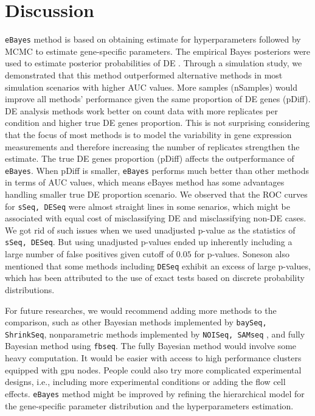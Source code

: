 \chapter{Discussion}


\texttt{eBayes} method is based on obtaining estimate for hyperparameters followed by MCMC to estimate gene-specific parameters. The empirical Bayes posteriors were used to estimate posterior probabilities of DE . Through a simulation study, we demonstrated that this method outperformed alternative methods in most simulation scenarios with higher AUC values. More samples (nSamples) would improve all methods' performance given the same proportion of DE genes (pDiff). DE analysis methods work better on count data with more replicates per condition and higher true DE genes proportion. This is not surprising considering that the focus of most methods is to model the variability in gene expression measurements and therefore increasing the number of replicates strengthen the estimate. The true DE genes proportion (pDiff) affects the outperformance of \texttt{eBayes}. When pDiff is smaller, \texttt{eBayes} performs much better than other methods in terms of AUC values, which means eBayes method has some advantages handling smaller true DE proportion scenario. We observed that the ROC curves for {\tt sSeq, DESeq} were almost straight lines in some senarios, which might be associated with equal cost of misclassifying DE and misclassifying non-DE cases. We got rid of such issues when we used unadjusted p-value as the statistics of {\tt sSeq, DESeq}. But using unadjusted p-values ended up inherently including a large number of false positives given cutoff of $0.05$ for p-values. Soneson \citep{soneson2013comparison} also mentioned that some methods including {\tt DESeq} exhibit an excess of large p-values, which has been attributed to the use of exact tests based on discrete probability distributions\citep{robles2012efficient}. 

For future researches, we would recommend adding more methods to the comparison, such as other Bayesian methods implemented by {\tt baySeq, ShrinkSeq}, nonparametric methods implemented by {\tt NOISeq, SAMseq} , and fully Bayesian method using {\tt fbseq}. The fully Bayesian method would involve some heavy computation. It would be easier with access to high performance clusters equipped with gpu nodes. People could also try more complicated experimental designs, i.e., including more experimental conditions or adding the flow cell effects. \texttt{eBayes} method might be improved by refining the hierarchical model for the gene-specific parameter distribution and the hyperparameters estimation. 